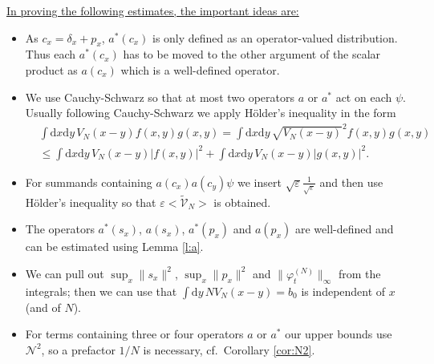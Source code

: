 \documentclass[11pt,a4paper,draft,DIV11]{scrartcl}	%
\newcommand{\di}{\textrm{d}}		%
\newcommand{\Ncal}{\mathcal{N}}		%
\newcommand{\tilV}{\tilde{\mathcal{V}}_N}		%
\newcommand{\norm}[1]{\lVert#1\rVert}	%
\newcommand{\ev}[1]{\big<#1\big>}	%
\newcommand{\ph}{\varphi_t^{(N)}}	%
\newcommand{\bd}{\begin{displaymath}}			%
\newcommand{\ed}{\end{displaymath}}
\begin{document}
\underline{In proving the following estimates, the important ideas are:}
\begin{itemize}
 \item As $c_x = \delta_x + p_x$, $a^*(c_x)$ is only defined as an operator-valued distribution. Thus each $a^\ast(c_x)$ has to be moved to the other argument of the scalar product as $a(c_x)$ which is a well-defined operator.
\item We use Cauchy-Schwarz so that at most two operators $a$ or $a^\ast$ act on each $\psi$. Usually following Cauchy-Schwarz we apply H\"older's inequality in the form
\bd
\begin{split}
& \int \di x \di y\, V_N(x-y) f(x,y) g(x,y) = \int \di x \di y\, \sqrt{V_N(x-y)}^2 f(x,y) g(x,y)\\
&  \leq \int \di x\di y\, V_N(x-y) \lvert f(x,y)\rvert^2 + \int \di x\di y\, V_N(x-y) \lvert g(x,y)\rvert^2.
\end{split}
\ed
 \item For summands containing $a(c_x) a(c_y) \psi$ we insert $\sqrt{\varepsilon} \frac{1}{\sqrt{\varepsilon}}$ and then use H\"older's inequality so that $\varepsilon\ev{\tilV}$ is obtained.
 \item The operators $a^\ast(s_x)$, $a(s_x)$, $a^\ast(p_x)$ and $a(p_x)$ are well-defined and can be estimated using Lemma \ref{l:a}.
 \item We can pull out $\sup_x \norm{s_x}^2$, $\sup_x \norm{p_x}^2$ and $\norm{\ph}_\infty$ from the integrals; then we can use that $\int \di y\, NV_N(x-y) = b_0$ is independent of $x$ (and of $N$).
\item For terms containing three or four operators $a$ or $a^\ast$ our upper bounds use $\Ncal^2$, so a prefactor $1/N$ is necessary, cf.\ Corollary \ref{cor:N2}. 
\end{itemize}
\end{document}
